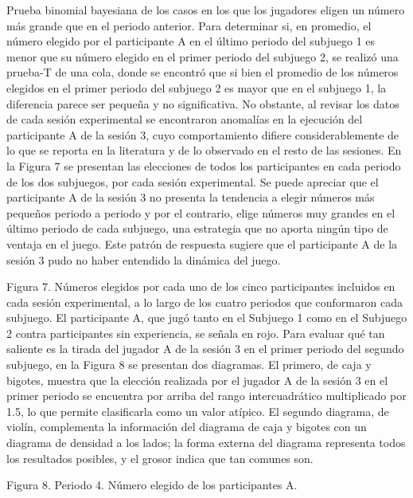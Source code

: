 Prueba binomial bayesiana de los casos en los que los jugadores eligen un número más grande que en el periodo anterior.
Para determinar si, en promedio, el número elegido por el participante A en el último periodo del subjuego 1 es menor que su número elegido en el primer periodo del subjuego 2, se realizó una prueba-T de una cola, donde se encontró que si bien el promedio de los números elegidos en el primer periodo del subjuego 2 es mayor que en el subjuego 1, la diferencia parece ser pequeña y no significativa.
No obstante, al revisar los datos de cada sesión experimental se encontraron anomalías en la ejecución del participante A de la sesión 3, cuyo comportamiento difiere considerablemente de lo que se reporta en la literatura y de lo observado en el resto de las sesiones.
En la Figura 7 se presentan las elecciones de todos los participantes en cada periodo de los dos subjuegos, por cada sesión experimental. Se puede apreciar que el participante A de la sesión 3 no presenta la tendencia a elegir números más pequeños periodo a periodo y por el contrario, elige números muy grandes en el último periodo de cada subjuego, una estrategia que no aporta ningún tipo de ventaja en el juego. Este patrón de respuesta sugiere que el participante A de la sesión 3 pudo no haber entendido la dinámica del juego.

  
  
  
  
  
Figura 7. Números elegidos por cada uno de los cinco participantes incluidos en cada sesión experimental, a lo largo de los cuatro periodos que conformaron cada  subjuego. El participante A, que jugó tanto en el Subjuego 1 como en el Subjuego 2 contra participantes sin experiencia, se señala en rojo.
Para evaluar qué tan saliente es la tirada del jugador A de la sesión 3 en el primer periodo del segundo subjuego, en la Figura 8 se presentan dos diagramas. El primero, de caja y bigotes, muestra que la elección realizada por el jugador A de la sesión 3  en el primer periodo se encuentra por arriba del rango intercuadrático multiplicado por 1.5, lo que permite clasificarla como un valor atípico.  El  segundo diagrama, de violín, complementa la información del diagrama de caja y bigotes con un diagrama de densidad a los lados; la forma externa del diagrama representa todos los resultados posibles, y el grosor indica que tan comunes son.

  
Figura 8. Periodo 4. Número elegido de los participantes A.

